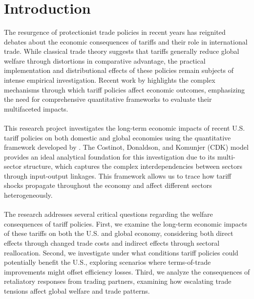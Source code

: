 \section{Introduction}

\paragraph{} The resurgence of protectionist trade policies in recent years has reignited debates about the economic consequences of tariffs and their role in international trade. While classical trade theory suggests that tariffs generally reduce global welfare through distortions in comparative advantage, the practical implementation and distributional effects of these policies remain subjects of intense empirical investigation. Recent work by \cite{ignatenko2025making} highlights the complex mechanisms through which tariff policies affect economic outcomes, emphasizing the need for comprehensive quantitative frameworks to evaluate their multifaceted impacts.

\paragraph{} This research project investigates the long-term economic impacts of recent U.S. tariff policies on both domestic and global economies using the quantitative framework developed by \cite{costinot2012TheReviewofEconomicStudies}. The Costinot, Donaldson, and Komunjer (CDK) model provides an ideal analytical foundation for this investigation due to its multi-sector structure, which captures the complex interdependencies between sectors through input-output linkages. This framework allows us to trace how tariff shocks propagate throughout the economy and affect different sectors heterogeneously.

\paragraph{} The research addresses several critical questions regarding the welfare consequences of tariff policies. First, we examine the long-term economic impacts of these tariffs on both the U.S. and global economy, considering both direct effects through changed trade costs and indirect effects through sectoral reallocation. Second, we investigate under what conditions tariff policies could potentially benefit the U.S., exploring scenarios where terms-of-trade improvements might offset efficiency losses. Third, we analyze the consequences of retaliatory responses from trading partners, examining how escalating trade tensions affect global welfare and trade patterns.

